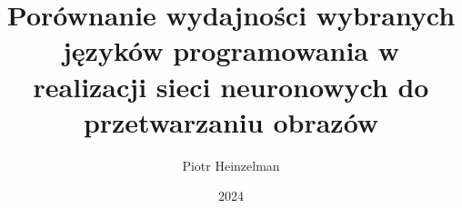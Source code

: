 \documentclass[thesis=inz,faculty=ee]{EE-dyplom}
\title{Porównanie wydajności wybranych języków programowania w realizacji sieci neuronowych do przetwarzaniu obrazów\\
}
\author{Piotr Heinzelman}
\date{2024}
\begin{document}
    \frontpages

    

    \bibliografia

    
    \listoffigures
    \listoftables
    \easyappendices
\end{document}
